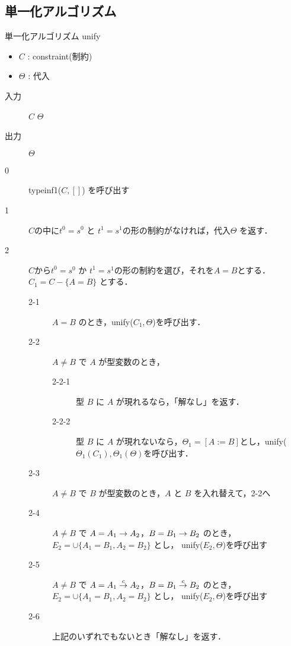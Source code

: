 \subsection{単一化アルゴリズム}
\begin{oframed}
  単一化アルゴリズム unify
  \begin{itemize}
    \setlength{\itemsep}{-5pt}
  \item $C$ : constraint(制約)
  \item $\Theta$ : 代入
  \end{itemize}

  \begin{description}
  \item[入力] $C$ $\Theta$
  \item[出力] $\Theta$
  \end{description}

  \begin{description}
  \item[0] typeinf1($C, []$) を呼び出す
  \item[1] $C$の中に$t^0=s^0$ と $t^1=s^1$の形の制約がなければ，代入$\Theta$ を返す．
  \item[2] $C$から$t^0=s^0$ か $t^1=s^1$の形の制約を選び，それを$A = B$とする．$C_1 = C - \{A = B\}$ とする．
    \begin{description}
    \item[2-1] $A = B$ のとき，unify($C_1, \Theta$)を呼び出す．
    \item[2-2] $A \neq B$ で $A$ が型変数のとき，
      \begin{description}
      \item[2-2-1] 型 $B$ に $A$ が現れるなら，「解なし」を返す．
      \item[2-2-2] 型 $B$ に $A$ が現れないなら，$\Theta_1 = [A := B]$とし，unify($\Theta_1(C_1), \Theta_1(\Theta)$を呼び出す．
      \end{description}
    \item[2-3] $A \neq B$ で $B$ が型変数のとき，$A$ と $B$ を入れ替えて，2-2へ
    \item[2-4] $A \neq B$ で $A = \funT{A_1}{A_2}{}$，$B = \funT{B_1}{B_2}{}$ のとき， $E_2 = \cup \{A_1 = B_1, A_2 = B_2\}$ とし， unify($E_2, \Theta$)を呼び出す
    \item[2-5] $A \neq B$ で $A = \funT{A_1}{A_2}{c}$，$B = \funT{B_1}{B_2}{c}$ のとき， $E_2 = \cup \{A_1 = B_1, A_2 = B_2\}$ とし， unify($E_2, \Theta$)を呼び出す
    \item[2-6] 上記のいずれでもないとき「解なし」を返す．
    \end{description}
  \end{description}
\end{oframed}

